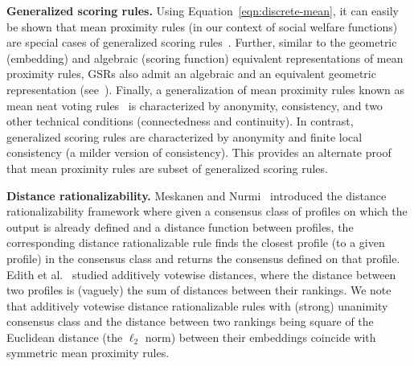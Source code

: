 \documentclass[prodmode,acmec]{ec-acmsmall}
\begin{document}
\medskip 
\noindent \textbf{Generalized scoring rules.} Using Equation~\eqref{eqn:discrete-mean}, it can easily be shown that mean proximity rules (in our context of social welfare functions) are special cases of generalized scoring rules~\cite{XC08}. Further, similar to the geometric (embedding) and algebraic (scoring function) equivalent representations of mean proximity rules, GSRs also admit an algebraic and an equivalent geometric representation (see~\cite{MPR12b}). Finally, a generalization of mean proximity rules known as mean neat voting rules~\cite{Zwicker08b} is characterized by anonymity, consistency, and two other technical conditions (connectedness and continuity). In contrast, generalized scoring rules are characterized by anonymity and finite local consistency (a milder version of consistency). This provides an alternate proof that mean proximity rules are subset of generalized scoring rules. 

\medskip
\noindent \textbf{Distance rationalizability.} Meskanen and Nurmi~\cite{MN08} introduced the distance rationalizability framework where given a consensus class of profiles on which the output is already defined and a distance function between profiles, the corresponding distance rationalizable rule finds the closest profile (to a given profile) in the consensus class and returns the consensus defined on that profile. Edith et al.~\cite{EFS10} studied additively votewise distances, where the distance between two profiles is (vaguely) the sum of distances between their rankings. We note that additively votewise distance rationalizable rules with (strong) unanimity consensus class and the distance between two rankings being square of the Euclidean distance (the $\ell_2$ norm) between their embeddings coincide with symmetric mean proximity rules. 

\end{document}
